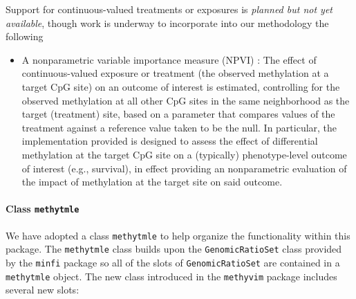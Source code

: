 \documentclass[9pt,a4paper,]{extarticle}
\theoremstyle{definition}
\theoremstyle{definition}
\theoremstyle{definition}
\theoremstyle{remark}
\begin{document}
Support for continuous-valued treatments or exposures is \emph{planned but not yet
available}, though work is underway to incorporate into our methodology the
following

\begin{itemize}
\item
  A nonparametric variable importance measure (NPVI) \citep{chambaz2012estimation}:
  The effect of continuous-valued exposure or treatment (the observed
  methylation at a target CpG site) on an outcome of interest is estimated,
  controlling for the observed methylation at all other CpG sites in the same
  neighborhood as the target (treatment) site, based on a parameter that
  compares values of the treatment against a reference value taken to be the
  null. In particular, the implementation provided is designed to assess the
  effect of differential methylation at the target CpG site on a (typically)
  phenotype-level outcome of interest (e.g., survival), in effect providing an
  nonparametric evaluation of the impact of methylation at the target site on
  said outcome.
\end{itemize}

\hypertarget{class-methytmle}{%
\paragraph{\texorpdfstring{Class \texttt{methytmle}}{Class methytmle}}\label{class-methytmle}}

We have adopted a class \texttt{methytmle} to help organize the functionality within
this package. The \texttt{methytmle} class builds upon the \texttt{GenomicRatioSet} class
provided by the \texttt{minfi} package so all of the slots of \texttt{GenomicRatioSet} are
contained in a \texttt{methytmle} object. The new class introduced in the \texttt{methyvim}
package includes several new slots:
\end{document}
